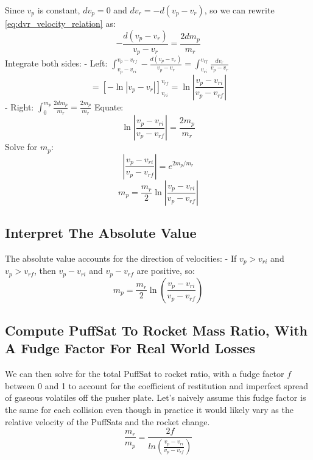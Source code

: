 \documentclass{article}
\begin{document}
Since \(v_p\) is constant,  \(dv_p = 0\) and  \(dv_r = -d(v_p-v_r)\), so we can rewrite \autoref{eq:dvr_velocity_relation} as:
\[
-\frac{d(v_p - v_r)}{v_p - v_r} = \frac{2 dm_p}{m_r}
\]
Integrate both sides:
- Left: \( \int_{v_p - v_{ri}}^{v_p - v_{rf}} -\frac{d(v_p - v_r)}{v_p - v_r} = \int_{v_{ri}}^{v_{rf}} \frac{dv_r}{v_p - v_r} \)
\[
= \left[ -\ln|v_p - v_r| \right]_{v_{ri}}^{v_{rf}} = \ln \left| \frac{v_p - v_{ri}}{v_p - v_{rf}} \right|
\]
- Right: \( \int_0^{m_p} \frac{2 dm_p}{m_r} = \frac{2 m_p}{m_r} \)
Equate:
\[
\ln \left| \frac{v_p - v_{ri}}{v_p - v_{rf}} \right| = \frac{2 m_p}{m_r}
\]
Solve for \( m_p \):
\[
\left| \frac{v_p - v_{ri}}{v_p - v_{rf}} \right| = e^{2 m_p / m_r}
\]
\begin{equation}
m_p = \frac{m_r}{2} \ln \left| \frac{v_p - v_{ri}}{v_p - v_{rf}} \right| 
\end{equation}
\subsection{Interpret The Absolute Value}   
The absolute value accounts for the direction of velocities:
- If \( v_p > v_{ri} \) and \( v_p > v_{rf} \),  then \( v_p - v_{ri} \) and \( v_p - v_{rf} \) are positive, so:
\[
m_p = \frac{m_r}{2} \ln \left( \frac{v_p - v_{ri}}{v_p - v_{rf}} \right)
\]
\subsection{Compute PuffSat To Rocket Mass Ratio, With A Fudge Factor For Real World Losses}

We can then solve for the total PuffSat to rocket ratio, with a fudge factor $f$ between 0 and 1 to account for the coefficient of restitution and imperfect spread of gaseous volatiles off the pusher plate.   Let's naively assume this fudge factor is the same for each collision even though in practice it would likely vary as the relative velocity of the PuffSats and the rocket change.
\begin{equation}
\frac{m_r}{m_p} = \frac{2f}{ln(\frac{v_p-v_{ri}}{v_p-v_{rf}})}\label{eq:PuffSat_ratio}
\end{equation}
\end{document}
